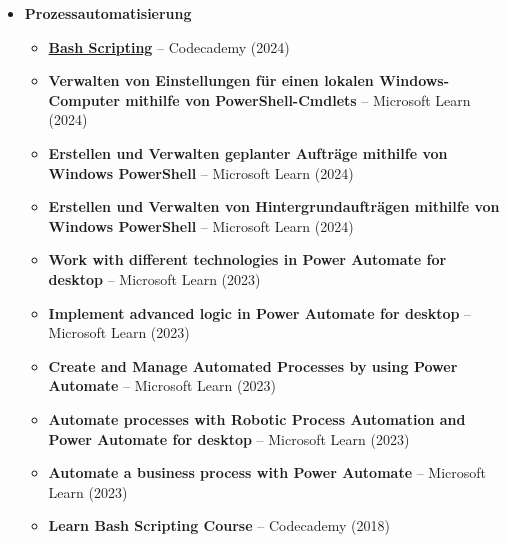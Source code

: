 \documentclass[a4paper,10pt]{article}
\begin{document}
\begin{itemize}
\begin{itemize}
            \item \textbf{Einführung in SAP S/4 HANA} – Hochschule Fresenius (2023)
            \item \textbf{Data Science - Definition, Grundlagen und Anwendungsbeispiele} – Hochschule Fresenius (2022)
            \item \textbf{Microsoft Excel VBA: Grundlagen der Programmierung} – Hochschule Fresenius (2022)
            \item \textbf{Excel Advanced} – Hochschule Fresenius (2022)
            \item \textbf{Learn R Course} – Codecademy (2019)
            \item \textbf{Learn Python 2 Course} – Codecademy (2019)

    \end{itemize}

    \newpage

    \item[\faCogs] \textbf{Prozessautomatisierung} \label{process}
    \begin{itemize}
        \item \textbf{\href{https://www.codecademy.com/profiles/_cosinus/certificates/37c55263a9f1b1f7603f7551c293ecbd}{Bash Scripting}} – Codecademy (2024)
        \item \textbf{Verwalten von Einstellungen für einen lokalen Windows-Computer mithilfe von PowerShell-Cmdlets} – Microsoft Learn (2024)
        \item \textbf{Erstellen und Verwalten geplanter Aufträge mithilfe von Windows PowerShell} – Microsoft Learn (2024) 
        \item \textbf{Erstellen und Verwalten von Hintergrundaufträgen mithilfe von Windows PowerShell} – Microsoft Learn (2024)   
        \item \textbf{Work with different technologies in Power Automate for desktop} – Microsoft Learn (2023)
        \item \textbf{Implement advanced logic in Power Automate for desktop} – Microsoft Learn (2023)
        \item \textbf{Create and Manage Automated Processes by using Power Automate} – Microsoft Learn (2023)
        \item \textbf{Automate processes with Robotic Process Automation and Power Automate for desktop} – Microsoft Learn (2023)
        \item \textbf{Automate a business process with Power Automate} – Microsoft Learn (2023)
        \item \textbf{Learn Bash Scripting Course} – Codecademy (2018)
    \end{itemize}


\end{itemize}
\end{document}
